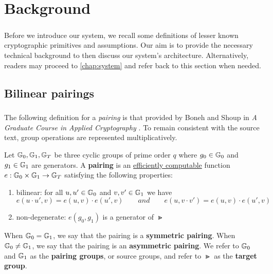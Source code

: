 \chapter{Background}
\label{chap:background}


\paragraph{} Before we introduce our system, we recall some definitions of lesser known cryptographic primitives and assumptions. Our aim is to provide the necessary technical background to then discuss our system's architecture. Alternatively, readers may proceed to \autoref{chap:system} and refer back to this section when needed.




\section{Bilinear pairings}

\paragraph{} The following definition for a \textit{pairing} is that provided by Boneh and Shoup in \textit{A Graduate Course in Applied Cryptography} \cite{BonehShoup}. To remain consistent with the source text, group operations are represented multiplicatively.

\begin{definition}
\label{def:pairing}
	Let $\mathbb{G}_0, \mathbb{G}_1, \mathbb{G}_T$ be three cyclic groups of prime order $q$ where $g_0 \in \mathbb{G}_0$ and $g_1 \in \mathbb{G}_1$ are generators. A \textbf{pairing} is an \underline{efficiently computable} function $e : \mathbb{G}_0 \times \mathbb{G}_1 \rightarrow \mathbb{G}_T$ satisfying the following properties:
	
		\begin{enumerate}
			\item bilinear: for all $u,u' \in \mathbb{G}_0$ and $v,v' \in \mathbb{G}_1$ we have
				$$
					e(u \cdot u', v) = e(u,v) \cdot e(u',v) \qquad and \qquad e(u, v \cdot v') = e(u,v) \cdot e(u',v)
				$$
				
			\item non-degenerate: $e(g_0, g_1)$ is a generator of $\Gt$
		\end{enumerate}
		
	When $\mathbb{G}_0 = \mathbb{G}_1$, we say that the pairing is a \textbf{symmetric pairing}. When $\mathbb{G}_0 \neq \mathbb{G}_1$, we say that the pairing is an \textbf{asymmetric pairing}. We refer to $\mathbb{G}_0$ and $\mathbb{G}_1$ as the \textbf{pairing groups}, or source groups, and refer to $\Gt$ as the \textbf{target group}.
\end{definition}

